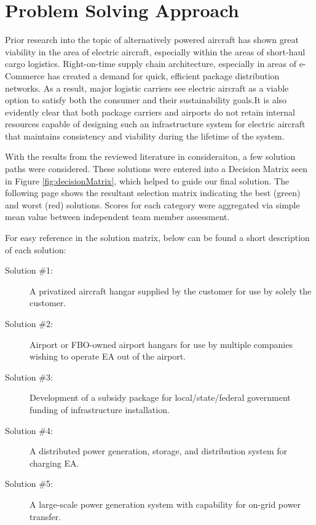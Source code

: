 \documentclass[../main.tex]{subfiles}
\begin{document}
\section{Problem Solving Approach}\label{finalDesign}
Prior research into the topic of alternatively powered aircraft has shown great viability in the area of electric aircraft, especially within the areas of short-haul cargo logistics. Right-on-time supply chain architecture, especially in areas of e-Commerce has created a demand for quick, efficient package distribution networks. As a result, major logistic carriers see electric aircraft as a viable option to satisfy both the consumer and their sustainability goals.It is also evidently clear that both package carriers and airports do not retain internal resources capable of designing such an infrastructure system for electric aircraft that maintains consistency and viability during the lifetime of the system.\par
With the results from the reviewed literature in consideraiton, a few solution paths were considered. These solutions were entered into a Decision Matrix seen in Figure \ref{fig:decisionMatrix}, which helped to guide our final solution. The following page shows the resultant selection matrix indicating the best (green) and worst (red) solutions. Scores for each category were aggregated via simple mean value between independent team member assessment.\par
\newpage
For easy reference in the solution matrix, below can be found a short description of each solution:
\begin{singlespace}
\begin{description}
    \item[Solution \#1:] A privatized aircraft hangar supplied by the customer for use by solely the customer.
    \item[Solution \#2:] Airport or FBO-owned airport hangars for use by multiple companies wishing to operate EA out of the airport.
    \item[Solution \#3:] Development of a subsidy package for local/state/federal government funding of infrastructure installation.
    \item[Solution \#4:] A distributed power generation, storage, and distribution system for charging EA.
    \item[Solution \#5:] A large-scale power generation system with capability for on-grid power transfer.
\end{description}
\end{singlespace}
\end{document}

